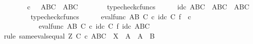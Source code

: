 \begin{isabellebody}
\ \ \ \ \isamarkupfalse%
\ {\isachardoublequoteopen}{\isasymphi}\isactrlsup {\isasymsharp}\isactrlsup {\isasymsharp}\ {\isasymcirc}\isactrlsub c\ {\isasympsi}\isactrlsup {\isasymsharp}\ {\isacharcolon}{\kern0pt}\ A\isactrlbsup B\isactrlesup \isactrlbsup C\isactrlesup \ {\isasymrightarrow}\ A\isactrlbsup B\isactrlesup \isactrlbsup C\isactrlesup {\isachardoublequoteclose}\isanewline
\ \ \ \ \ \ \isamarkupfalse%
\ typecheck{\isacharunderscore}{\kern0pt}cfuncs\isanewline
\ \ \ \ \isamarkupfalse%
\ {\isachardoublequoteopen}id\isactrlsub c\ {\isacharparenleft}{\kern0pt}A\isactrlbsup B\isactrlesup \isactrlbsup C\isactrlesup {\isacharparenright}{\kern0pt}\ {\isacharcolon}{\kern0pt}\ A\isactrlbsup B\isactrlesup \isactrlbsup C\isactrlesup \ {\isasymrightarrow}\ A\isactrlbsup B\isactrlesup \isactrlbsup C\isactrlesup {\isachardoublequoteclose}\isanewline
\ \ \ \ \ \ \isamarkupfalse%
\ typecheck{\isacharunderscore}{\kern0pt}cfuncs\isanewline
\ \ \ \ \isamarkupfalse%
\ {\isachardoublequoteopen}eval{\isacharunderscore}{\kern0pt}func\ {\isacharparenleft}{\kern0pt}A\isactrlbsup B\isactrlesup {\isacharparenright}{\kern0pt}\ C\ {\isasymcirc}\isactrlsub c\ id\isactrlsub c\ C\ {\isasymtimes}\isactrlsub f\ {\isasymphi}\isactrlsup {\isasymsharp}\isactrlsup {\isasymsharp}\ {\isasymcirc}\isactrlsub c\ {\isasympsi}\isactrlsup {\isasymsharp}\ {\isacharequal}{\kern0pt}\isanewline
\ \ \ \ \ \ \ \ \ \ eval{\isacharunderscore}{\kern0pt}func\ {\isacharparenleft}{\kern0pt}A\isactrlbsup B\isactrlesup {\isacharparenright}{\kern0pt}\ C\ {\isasymcirc}\isactrlsub c\ id\isactrlsub c\ C\ {\isasymtimes}\isactrlsub f\ id\isactrlsub c\ {\isacharparenleft}{\kern0pt}A\isactrlbsup B\isactrlesup \isactrlbsup C\isactrlesup {\isacharparenright}{\kern0pt}{\isachardoublequoteclose}\isanewline
\ \ \ \ \isamarkupfalse%
{\isacharparenleft}{\kern0pt}rule\ same{\isacharunderscore}{\kern0pt}evals{\isacharunderscore}{\kern0pt}equal{\isacharbrackleft}{\kern0pt}\ Z{\isacharequal}{\kern0pt}\ {\isachardoublequoteopen}C\ {\isasymtimes}\isactrlsub c\ {\isacharparenleft}{\kern0pt}{\isacharparenleft}{\kern0pt}A\isactrlbsup B\isactrlesup {\isacharparenright}{\kern0pt}\isactrlbsup C\isactrlesup {\isacharparenright}{\kern0pt}{\isachardoublequoteclose}{\isacharcomma}{\kern0pt}\ \ X\ {\isacharequal}{\kern0pt}\ {\isachardoublequoteopen}A{\isachardoublequoteclose}{\isacharcomma}{\kern0pt}\ \ A\ {\isacharequal}{\kern0pt}\ {\isachardoublequoteopen}B{\isachardoublequoteclose}{\isacharbrackright}{\kern0pt}{\isacharparenright}{\kern0pt}\isanewline

\end{isabellebody}
